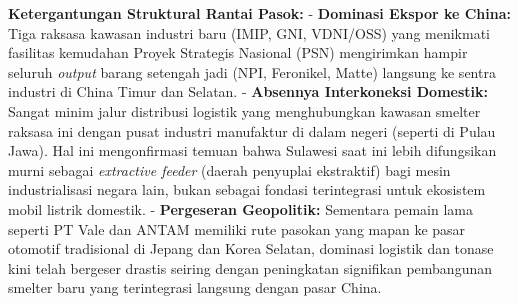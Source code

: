 \documentclass[
]{article}
\begin{document}
\textbf{Ketergantungan Struktural Rantai Pasok:} - \textbf{Dominasi
Ekspor ke China:} Tiga raksasa kawasan industri baru (IMIP, GNI,
VDNI/OSS) yang menikmati fasilitas kemudahan Proyek Strategis Nasional
(PSN) mengirimkan hampir seluruh \emph{output} barang setengah jadi
(NPI, Feronikel, Matte) langsung ke sentra industri di China Timur dan
Selatan. - \textbf{Absennya Interkoneksi Domestik:} Sangat minim jalur
distribusi logistik yang menghubungkan kawasan smelter raksasa ini
dengan pusat industri manufaktur di dalam negeri (seperti di Pulau
Jawa). Hal ini mengonfirmasi temuan bahwa Sulawesi saat ini lebih
difungsikan murni sebagai \emph{extractive feeder} (daerah penyuplai
ekstraktif) bagi mesin industrialisasi negara lain, bukan sebagai
fondasi terintegrasi untuk ekosistem mobil listrik domestik. -
\textbf{Pergeseran Geopolitik:} Sementara pemain lama seperti PT Vale
dan ANTAM memiliki rute pasokan yang mapan ke pasar otomotif tradisional
di Jepang dan Korea Selatan, dominasi logistik dan tonase kini telah
bergeser drastis seiring dengan peningkatan signifikan pembangunan
smelter baru yang terintegrasi langsung dengan pasar China.
\end{document}
